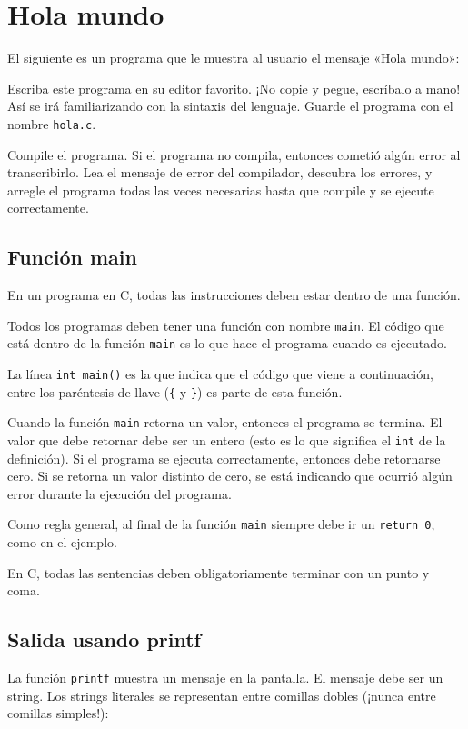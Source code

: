 \chapter{Hola mundo}

El siguiente es un programa que le muestra al usuario el mensaje «Hola
mundo»:

Escriba este programa en su editor favorito. ¡No copie y pegue,
escríbalo a mano! Así se irá familiarizando con la sintaxis del
lenguaje. Guarde el programa con el nombre \lstinline!hola.c!.

Compile el programa. Si el programa no compila, entonces cometió algún
error al transcribirlo. Lea el mensaje de error del compilador, descubra
los errores, y arregle el programa todas las veces necesarias hasta que
compile y se ejecute correctamente.

\section{Función main}

En un programa en C, todas las instrucciones deben estar dentro de una
función.

Todos los programas deben tener una función con nombre \lstinline!main!.
El código que está dentro de la función \lstinline!main! es lo que hace
el programa cuando es ejecutado.

La línea \lstinline!int main()! es la que indica que el código que viene
a continuación, entre los paréntesis de llave (\lstinline!{! y
\lstinline!}!) es parte de esta función.

Cuando la función \lstinline!main! retorna un valor, entonces el
programa se termina. El valor que debe retornar debe ser un entero (esto
es lo que significa el \lstinline!int! de la definición). Si el programa
se ejecuta correctamente, entonces debe retornarse cero. Si se retorna
un valor distinto de cero, se está indicando que ocurrió algún error
durante la ejecución del programa.

Como regla general, al final de la función \lstinline!main! siempre debe
ir un \lstinline!return 0!, como en el ejemplo.

En C, todas las sentencias deben obligatoriamente terminar con un punto
y coma.

\section{Salida usando printf}

La función \lstinline!printf! muestra un mensaje en la pantalla. El
mensaje debe ser un string. Los strings literales se representan entre
comillas dobles (¡nunca entre comillas simples!):

